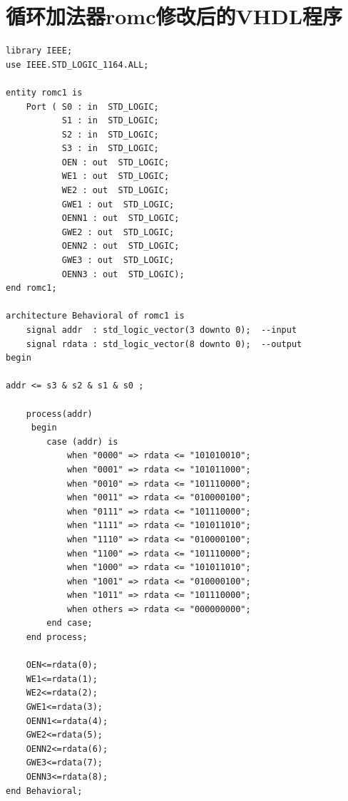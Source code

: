 \documentclass[a4paper]{ctexart}
\begin{document}
\section{循环加法器romc修改后的VHDL程序}\label{循环加法器romc程序}
\begin{lstlisting}
library IEEE;
use IEEE.STD_LOGIC_1164.ALL;

entity romc1 is
    Port ( S0 : in  STD_LOGIC;
           S1 : in  STD_LOGIC;
           S2 : in  STD_LOGIC;
           S3 : in  STD_LOGIC;
           OEN : out  STD_LOGIC;
           WE1 : out  STD_LOGIC;
           WE2 : out  STD_LOGIC;
           GWE1 : out  STD_LOGIC;
           OENN1 : out  STD_LOGIC;
           GWE2 : out  STD_LOGIC;
           OENN2 : out  STD_LOGIC;
           GWE3 : out  STD_LOGIC;
           OENN3 : out  STD_LOGIC);
end romc1;

architecture Behavioral of romc1 is
    signal addr  : std_logic_vector(3 downto 0);  --input
    signal rdata : std_logic_vector(8 downto 0);  --output
begin

addr <= s3 & s2 & s1 & s0 ;
	
    process(addr)
	 begin
		case (addr) is
			when "0000" => rdata <= "101010010";
			when "0001" => rdata <= "101011000";
			when "0010" => rdata <= "101110000";
			when "0011" => rdata <= "010000100";
			when "0111" => rdata <= "101110000";
			when "1111" => rdata <= "101011010";
			when "1110" => rdata <= "010000100";
			when "1100" => rdata <= "101110000";
			when "1000" => rdata <= "101011010";
			when "1001" => rdata <= "010000100";
			when "1011" => rdata <= "101110000";
			when others => rdata <= "000000000";
		end case;
	end process;
	 
	OEN<=rdata(0);
    WE1<=rdata(1);
    WE2<=rdata(2);
    GWE1<=rdata(3);
    OENN1<=rdata(4);
    GWE2<=rdata(5);
    OENN2<=rdata(6);
    GWE3<=rdata(7);
    OENN3<=rdata(8);
end Behavioral;
\end{lstlisting}

\newpage
\end{document}
